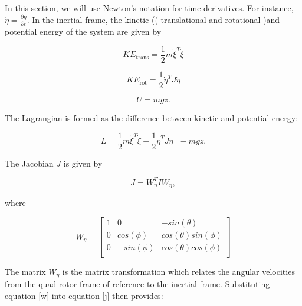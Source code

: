 In this section, we will use Newton's notation for time derivatives. For instance, $\dot \eta = \frac{\partial \eta}{\partial t} $.  In the inertial frame, the kinetic (( translational and rotational )and potential energy of the system are given by

\begin{equation}
    KE_{\text{trans}}=\frac{1}{2}m\dot{\xi }^T\dot{\xi }
\end{equation}


\begin{equation}
    KE_{\text{rot}}= \frac{1}{2}\dot{\eta }^T J \dot{\eta }
\end{equation}


\begin{equation}
    U = m g z.
\end{equation}


The Lagrangian is formed as the difference between kinetic and potential energy:

\begin{equation}
    L = \frac{1}{2}m\dot{\xi }^T\dot{\xi }+\frac{1}{2}\dot{\eta }^T   J   \dot{\eta }\text{  }- m g z .
\end{equation}

The Jacobian $J$ is given by

\begin{equation}
  \label{j}
    J = W_{\eta}^T I W_{\eta} ,
\end{equation}

where

\begin{equation}
\label{w}
 W_{\eta} = \left[ \begin{array}{ccc}
1 & 0 & -sin(\theta)\\ 0 & cos(\phi) & cos(\theta) sin(\phi)\\ 0 & -sin(\phi) & cos(\theta) cos(\phi)\\
\end{array} \right]
\end{equation}



\noindent The matrix $ W_{\eta}$ is the matrix transformation which relates the angular velocities from the quad-rotor frame of reference to the inertial frame. Substituting equation \ref{w} into equation \ref{j} then provides:



